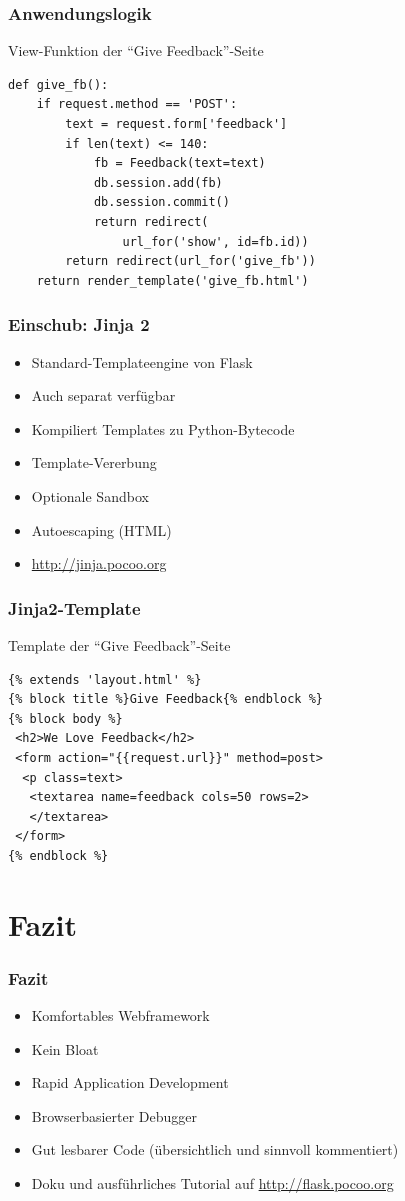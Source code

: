 \documentclass{beamer}
\begin{document}
\begin{frame}[fragile]
  \frametitle{Anwendungslogik}
  \begin{exampleblock}{View-Funktion der \enquote{Give Feedback}-Seite}
    \begin{lstlisting}
def give_fb():
    if request.method == 'POST':
        text = request.form['feedback']
        if len(text) <= 140:
            fb = Feedback(text=text)
            db.session.add(fb)
            db.session.commit()
            return redirect(
                url_for('show', id=fb.id))
        return redirect(url_for('give_fb'))
    return render_template('give_fb.html')
    \end{lstlisting}
  \end{exampleblock}
\end{frame}

\begin{frame}
  \frametitle{Einschub: Jinja 2}
  \begin{itemize}
    \item Standard-Templateengine von Flask
    \item Auch separat verfügbar
    \item Kompiliert Templates zu Python-Bytecode
    \item Template-Vererbung
    \item Optionale Sandbox
    \item Autoescaping (HTML)
    \item \url{http://jinja.pocoo.org}
  \end{itemize}
\end{frame}

\begin{frame}[fragile]
  \frametitle{Jinja2-Template}
  \begin{exampleblock}{Template der \enquote{Give Feedback}-Seite}
    \begin{lstlisting}[syntax=HTML]
{% extends 'layout.html' %}
{% block title %}Give Feedback{% endblock %}
{% block body %}
 <h2>We Love Feedback</h2>
 <form action="{{request.url}}" method=post>
  <p class=text>
   <textarea name=feedback cols=50 rows=2>
   </textarea>
 </form>
{% endblock %}
    \end{lstlisting}
  \end{exampleblock}
\end{frame}

\section{Fazit}
\begin{frame}
  \frametitle{Fazit}
  \begin{itemize}
    \item Komfortables Webframework
    \item Kein Bloat
    \item Rapid Application Development
    \item Browserbasierter Debugger
    \item Gut lesbarer Code (übersichtlich und sinnvoll kommentiert)
    \item Doku und ausführliches Tutorial auf \url{http://flask.pocoo.org}
  \end{itemize}
\end{frame}
\end{document}
